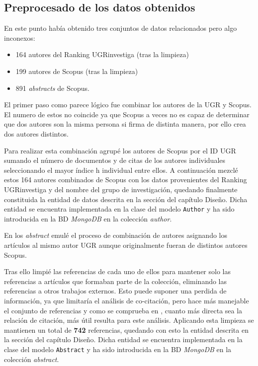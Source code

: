 \subsection{Preprocesado de los datos obtenidos}
En este punto había obtenido tres conjuntos de datos relacionados pero algo inconexos:
\begin{itemize}
	\item 164 autores del Ranking UGRinvestiga (tras la limpieza)
	\item 199 autores de Scopus (tras la limpieza)
	\item 891 \textit{abstracts} de Scopus. 
\end{itemize}

El primer paso como parece lógico fue combinar los autores de la \acrshort{UGR} y Scopus. El numero de estos no coincide ya que Scopus a veces no es capaz de determinar que dos autores son la misma persona si firma de distinta manera, por ello crea dos autores distintos.

Para realizar esta combinación agrupé los autores de Scopus por el ID \acrshort{UGR} sumando el número de documentos y de citas de los autores individuales seleccionando el mayor índice h individual entre ellos. A continuación mezclé estos 164 autores combinados de Scopus con los datos provenientes del Ranking UGRinvestiga y del nombre del grupo de investigación, quedando finalmente constituida la entidad de datos descrita en la sección  del capítulo Diseño. Dicha entidad se encuentra implementada en la clase del modelo \texttt{Author} y ha sido introducida en la \acrshort{BD} \textit{MongoDB} en la colección \textit{author}.

En los \textit{abstract} emulé el proceso de combinación de autores asignando los artículos al mismo autor \acrshort{UGR} aunque originalmente fueran de distintos autores Scopus. 

Tras ello limpié las referencias de cada uno de ellos para mantener solo las referencias a artículos que formaban parte de la colección, eliminando las referencias a otros trabajos externos. Esto puede suponer una perdida de información, ya que limitaría el análisis de co-citación, pero hace más manejable el conjunto de referencias y como se comprueba en \cite{DBLP:conf/ecir/SarolLS18}, cuanto más directa sea la relación de citación, más útil resulta para este análisis. Aplicando esta limpieza se mantienen un total de \textbf{742} referencias, quedando con esto la entidad descrita en la sección  del capítulo Diseño. Dicha entidad se encuentra implementada en la clase del modelo \texttt{Abstract} y ha sido introducida en la \acrshort{BD} \textit{MongoDB} en la colección \textit{abstract}.



